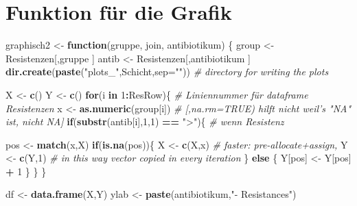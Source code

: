 \documentclass[
]{article}
\newenvironment{Shaded}{\begin{snugshade}}{\end{snugshade}}
\newcommand{\CommentTok}[1]{\textcolor[rgb]{0.56,0.35,0.01}{\textit{#1}}}
\newcommand{\ControlFlowTok}[1]{\textcolor[rgb]{0.13,0.29,0.53}{\textbf{#1}}}
\newcommand{\DataTypeTok}[1]{\textcolor[rgb]{0.13,0.29,0.53}{#1}}
\newcommand{\DecValTok}[1]{\textcolor[rgb]{0.00,0.00,0.81}{#1}}
\newcommand{\KeywordTok}[1]{\textcolor[rgb]{0.13,0.29,0.53}{\textbf{#1}}}
\newcommand{\NormalTok}[1]{#1}
\newcommand{\OperatorTok}[1]{\textcolor[rgb]{0.81,0.36,0.00}{\textbf{#1}}}
\newcommand{\StringTok}[1]{\textcolor[rgb]{0.31,0.60,0.02}{#1}}
\begin{document}
\hypertarget{funktion-fuxfcr-die-grafik}{%
\section{Funktion für die Grafik}\label{funktion-fuxfcr-die-grafik}}

\begin{Shaded}
\begin{Highlighting}[]
\NormalTok{graphisch2 <-}\StringTok{ }\ControlFlowTok{function}\NormalTok{(gruppe, join, antibiotikum) \{}
\NormalTok{  group <-}\StringTok{ }\NormalTok{Resistenzen[,gruppe ] }
\NormalTok{  antib      <-}\StringTok{ }\NormalTok{Resistenzen[,antibiotikum ]}
  \KeywordTok{dir.create}\NormalTok{(}\KeywordTok{paste}\NormalTok{(}\StringTok{"plots_"}\NormalTok{,Schicht,}\DataTypeTok{sep=}\StringTok{""}\NormalTok{))             }\CommentTok{# directory for writing the plots}

\NormalTok{  X <-}\StringTok{ }\KeywordTok{c}\NormalTok{()}
\NormalTok{  Y <-}\StringTok{ }\KeywordTok{c}\NormalTok{()}
  \ControlFlowTok{for}\NormalTok{(i }\ControlFlowTok{in} \DecValTok{1}\OperatorTok{:}\NormalTok{ResRow)\{                      }\CommentTok{# Liniennummer für dataframe Resistenzen}
\NormalTok{    x <-}\StringTok{ }\KeywordTok{as.numeric}\NormalTok{(group[i])              }\CommentTok{# [,na.rm=TRUE) hilft nicht weil's "NA" ist, nicht NA]}
    \ControlFlowTok{if}\NormalTok{(}\KeywordTok{substr}\NormalTok{(antib[i],}\DecValTok{1}\NormalTok{,}\DecValTok{1}\NormalTok{) }\OperatorTok{==}\StringTok{ ">"}\NormalTok{)\{       }\CommentTok{# wenn Resistenz}
      
\NormalTok{      pos <-}\StringTok{ }\KeywordTok{match}\NormalTok{(x,X)                   }
      \ControlFlowTok{if}\NormalTok{(}\KeywordTok{is.na}\NormalTok{(pos))\{}
\NormalTok{        X <-}\StringTok{ }\KeywordTok{c}\NormalTok{(X,x)    }\CommentTok{# faster: pre-allocate+assign,}
\NormalTok{        Y <-}\StringTok{ }\KeywordTok{c}\NormalTok{(Y,}\DecValTok{1}\NormalTok{)    }\CommentTok{# in this way vector copied in every iteration}
\NormalTok{      \} }\ControlFlowTok{else}\NormalTok{ \{}
\NormalTok{        Y[pos] <-}\StringTok{ }\NormalTok{Y[pos] }\OperatorTok{+}\StringTok{ }\DecValTok{1}
\NormalTok{      \}}
\NormalTok{    \}}
\NormalTok{  \}  }

\NormalTok{  df <-}\StringTok{ }\KeywordTok{data.frame}\NormalTok{(X,Y)}
\NormalTok{  ylab <-}\StringTok{ }\KeywordTok{paste}\NormalTok{(antibiotikum,}\StringTok{"- Resistances"}\NormalTok{)}
  

\end{Highlighting}
\end{Shaded}
\end{document}
